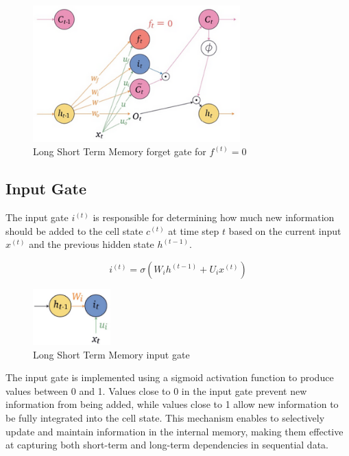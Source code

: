 \begin{figure}[h]
    \centering
    \includegraphics[width=8cm]{Images/lstm-forget-gate-f0.png}
    \caption{Long Short Term Memory forget gate for $f^{(t)} = 0$}
    \label{fig:lstm-forget-gate-f0}
\end{figure}

\subsection{Input Gate}

The input gate $i^{(t)}$ is responsible for determining how much new information should be added to the cell state $c^{(t)}$ at time step $t$ based on the current input $x^{(t)}$ and the previous hidden state $h^{(t-1)}$. 

$$ i^{(t)} = \sigma \left( W_i h^{(t-1)} + U_i x^{(t)} \right) $$

\begin{figure}[h]
    \centering
    \includegraphics[width=3cm]{Images/lstm-input-gate.png}
    \caption{Long Short Term Memory input gate}
    \label{fig:lstm-input-gate}
\end{figure}

\newpage
\noindent The input gate is implemented using a sigmoid activation function to produce values between 0 and 1. Values close to 0 in the input gate prevent new information from being added, while values close to 1 allow new information to be fully integrated into the cell state. This mechanism enables to selectively update and maintain information in the internal memory, making them effective at capturing both short-term and long-term dependencies in sequential data.

